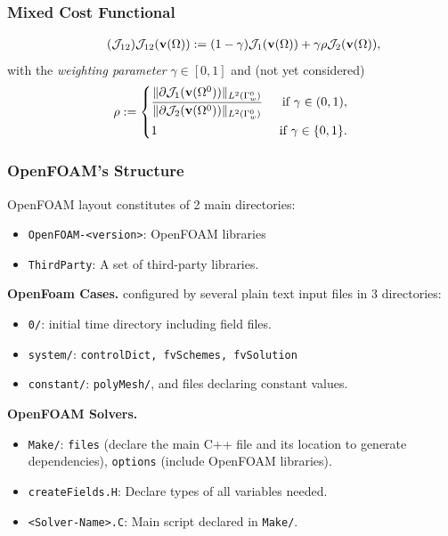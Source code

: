 \documentclass[t,xcolor=table,english]{beamer}   %
\begin{document}
\begin{frame}
	\frametitle{Mixed Cost Functional}
	\begin{align}
	\label{J12}
	\tag{$\mathcal{J}_{12}$}
	\mathcal{J}_{12}({\bf v}(\Omega)) := (1 - \gamma)\mathcal{J}_1({\bf v}(\Omega)) + \gamma\rho\mathcal{J}_2({\bf v}(\Omega)),
	\end{align}
	with the \textit{weighting parameter}  $\gamma \in [0,1]$ and (not yet considered)
	\begin{equation*}
	\rho := \left\{\begin{split}
	&\frac{\|\partial \mathcal{J}_1({\bf v}(\Omega^0))\|_{L^2(\Gamma_w^0)}}{\|\partial \mathcal{J}_2({\bf v}(\Omega^0))\|_{L^2(\Gamma_w^0)}} &\mbox{ if } \gamma \in (0,1),\\
	&1 &\mbox{ if } \gamma\in \{0,1\}.
	\end{split}\right.
	\end{equation*}
\end{frame}

\begin{frame}
	\frametitle{OpenFOAM's Structure}
	OpenFOAM layout constitutes of 2 main directories:
	\begin{itemize}
		\item \texttt{OpenFOAM-<version>}:   OpenFOAM libraries
		\item \texttt{ThirdParty}: A set of third-party libraries.
	\end{itemize}
	\textbf{OpenFoam Cases.} configured by several plain text input files in 3 directories:
	\begin{itemize}
		\item \texttt{0/}: initial time directory including field files.
		\item \texttt{system/}: \texttt{controlDict, fvSchemes, fvSolution}
		\item \texttt{constant/}: \texttt{polyMesh/}, and files declaring constant values.
	\end{itemize}
	\textbf{OpenFOAM Solvers.}
	\begin{itemize}
		\item \texttt{Make/}: \texttt{files} (declare the main C++ file and its location to generate dependencies), \texttt{options} (include OpenFOAM libraries).
		\item \texttt{createFields.H}: Declare types of all variables needed.
		\item \texttt{<Solver-Name>.C}: Main script declared in \texttt{Make/}.
	\end{itemize}
\end{frame}
\end{document}
